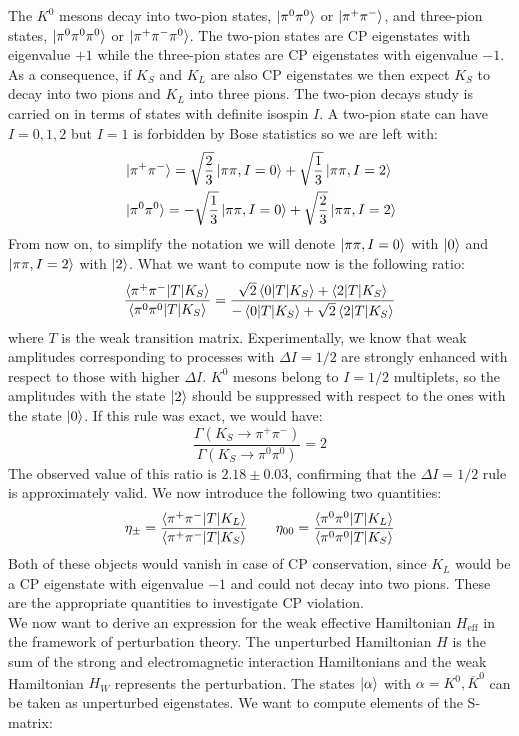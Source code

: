 \documentclass[../main.tex]{subfiles}
\begin{document}
The $K^0$ mesons decay into two-pion states, $\ket{\pi^0\pi^0}$ or $\ket{\pi^+\pi^-}$, and three-pion states, $\ket{\pi^0\pi^0\pi^0}$ or $\ket{\pi^+\pi^-\pi^0}$. The two-pion states are CP eigenstates with eigenvalue $+1$ while the three-pion states are CP eigenstates with eigenvalue $-1$. As a consequence, if $K_S$ and $K_L$ are also CP eigenstates we then expect $K_S$ to decay into two pions and $K_L$ into three pions. The two-pion decays study is carried on in terms of states with definite isospin $I$. A two-pion state can have $I=0,1,2$  but $I=1$ is forbidden by Bose statistics so we are left with:
\[
\begin{aligned}
&\ket{\pi^+\pi^-}=\sqrt{\frac{2}{3}}\ket{\pi\pi,I=0}+\sqrt{\frac{1}{3}}\ket{\pi\pi,I=2}\\
&\ket{\pi^0\pi^0}=-\sqrt{\frac{1}{3}}\ket{\pi\pi,I=0}+\sqrt{\frac{2}{3}}\ket{\pi\pi,I=2}
\end{aligned}
\]
From now on, to simplify the notation we will denote $\ket{\pi\pi,I=0}$ with $\ket{0}$ and $\ket{\pi\pi,I=2}$ with $\ket{2}$. What we want to compute now is the following ratio:
\[
\frac{\braket{\pi^+\pi^-|T|K_S}}{\braket{\pi^0\pi^0|T|K_S}}=\frac{\sqrt{2}\braket{0|T|K_S}+\braket{2|T|K_S}}{-\braket{0|T|K_S}+\sqrt{2}\braket{2|T|K_S}}
\]
where $T$ is the weak transition matrix. Experimentally, we know that weak amplitudes corresponding to processes with $\Delta I=1/2$ are strongly enhanced with respect to those with higher $\Delta I$. $K^0$ mesons belong to $I=1/2$ multiplets, so the amplitudes with the state $\ket{2}$ should be suppressed with respect to the ones with the state $\ket{0}$. If this rule was exact, we would have:
\[
\frac{\Gamma(K_S\to\pi^+\pi^-)}{\Gamma(K_S\to\pi^0\pi^0)}=2
\]
The observed value of this ratio is $2.18\pm0.03$, confirming that the $\Delta I=1/2$ rule is approximately valid. We now introduce the following two quantities:
\[
\eta_\pm=\frac{\braket{\pi^+\pi^-|T|K_L}}{\braket{\pi^+\pi^-|T|K_S}} \qquad \eta_{00}=\frac{\braket{\pi^0\pi^0|T|K_L}}{\braket{\pi^0\pi^0|T|K_S}}
\]
Both of these objects would vanish in case of CP conservation, since $K_L$ would be a CP eigenstate with eigenvalue $-1$ and could not decay into two pions. These are the appropriate quantities to investigate CP violation.\\
We now want to derive an expression for the weak effective Hamiltonian $H_{\text{eff}}$ in the framework of perturbation theory. The unperturbed Hamiltonian $H$ is the sum of the strong and electromagnetic interaction Hamiltonians and the weak Hamiltonian $H_W$ represents the perturbation. The states $\ket{\alpha}$ with $\alpha=K^0,\overline{K}^0$ can be taken as unperturbed eigenstates. We want to compute elements of the S-matrix:
\end{document}
